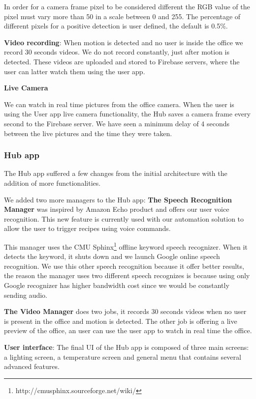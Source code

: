 \documentclass[conference]{IEEEtran}
\begin{document}
In order for a camera frame pixel to be considered different the RGB value of the pixel must vary more than 50 in a scale between 0 and 255. The percentage of different pixels for a positive detection is user defined, the default is 0.5\%.


\textbf{Video recording}: When motion is detected and no user is inside the office we record 30 seconds videos. We do not record constantly, just after motion is detected. These videos are uploaded and stored to Firebase servers, where the user can latter watch them using the user app.

\textbf{Live Camera}

We can watch in real time pictures from the office camera. When the user is using the User app live camera functionality, the Hub saves a camera frame every second to the Firebase server. We have seen a minimum delay of 4 seconds between the live pictures and the time they were taken.



\subsubsection{Hub app}

The Hub app suffered a few changes from the initial architecture with the addition of more functionalities.

We added two more managers to the Hub app: 
\textbf{The Speech Recognition Manager} was inspired by Amazon Echo product and offers our user voice recognition. This new feature is currently used with our automation solution to allow the user to trigger recipes using voice commands. 

This manager uses the CMU Sphinx\footnote{http://cmusphinx.sourceforge.net/wiki/} offline keyword speech recognizer. When it detects the keyword, it shuts down and we launch Google online speech recognition. We use this other speech recognition because it offer better results, the reason the manager uses two different speech recognizes is because using only Google recognizer has higher bandwidth cost since we would be constantly sending audio. 

\textbf{The Video Manager} does two jobs, it records 30 seconds videos when no user is present in the office and motion is detected. The other job is offering a live preview of the office, an user can use the user app to watch in real time the office.



\textbf{User interface}: The final \ac{UI} of the Hub app is composed of three main screens: a lighting screen, a temperature screen and general menu that contains several advanced features.
\end{document}
